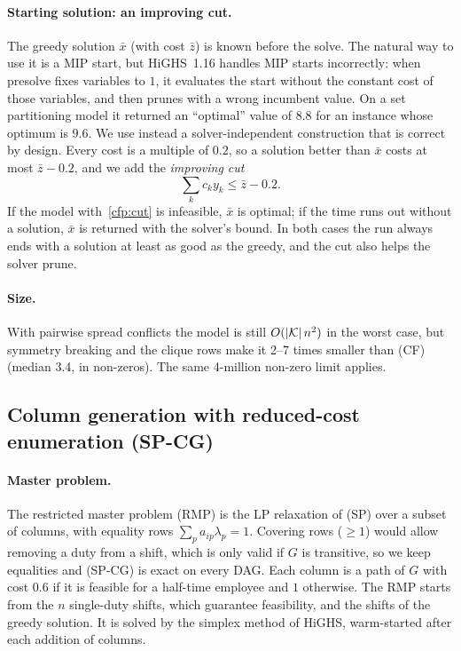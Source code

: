 \paragraph{Starting solution: an improving cut.} The greedy solution
$\bar x$ (with cost $\bar z$) is known before the solve. The natural way to
use it is a MIP start, but HiGHS~1.16 handles MIP starts incorrectly: when
presolve fixes variables to $1$, it evaluates the start without the constant
cost of those variables, and then prunes with a wrong incumbent value. On a
set partitioning model it returned an ``optimal'' value of $8.8$ for an
instance whose optimum is $9.6$. We use instead a solver-independent
construction that is correct by design. Every cost is a multiple of $0.2$, so
a solution better than $\bar x$ costs at most $\bar z-0.2$, and we add the
\emph{improving cut}
\begin{equation}\label{cfp:cut}
  \textstyle\sum_k c_k y_k\le \bar z-0.2 .
\end{equation}
If the model with~\eqref{cfp:cut} is infeasible, $\bar x$ is optimal; if the
time runs out without a solution, $\bar x$ is returned with the solver's
bound. In both cases the run always ends with a solution at least as good as
the greedy, and the cut also helps the solver prune.

\paragraph{Size.} With pairwise spread conflicts the model is still
$O(|\mathcal{K}|\,n^2)$ in the worst case, but symmetry breaking and the clique rows
make it 2--7 times smaller than (CF) (median 3.4, in non-zeros). The same
4-million non-zero limit applies.

\subsection{Column generation with reduced-cost enumeration (SP-CG)}
\label{sec:cg}

\paragraph{Master problem.} The restricted master problem (RMP) is the LP
relaxation of (SP) over a subset of columns, with equality rows
$\sum_p a_{ip}\lambda_p=1$. Covering rows ($\ge1$) would allow removing a
duty from a shift, which is only valid if $G$ is transitive, so we keep
equalities and (SP-CG) is exact on every DAG. Each column is a path of $G$
with cost $0.6$ if it is feasible for a half-time employee and $1$ otherwise.
The RMP starts from the $n$ single-duty shifts, which guarantee feasibility,
and the shifts of the greedy solution. It is solved by the simplex method of
HiGHS, warm-started after each addition of columns.

